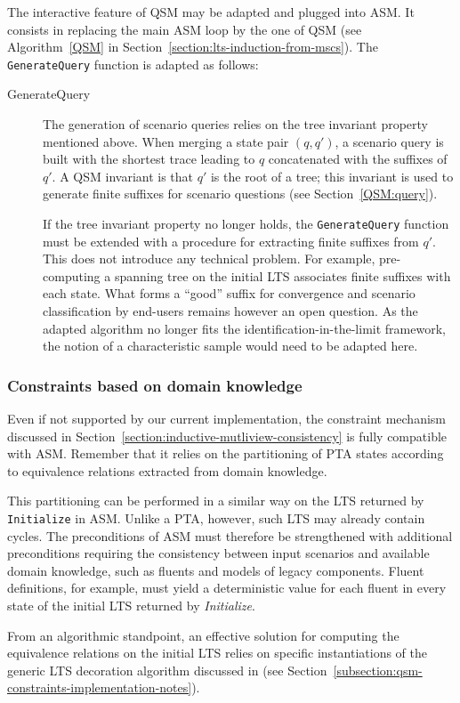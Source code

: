 The interactive feature of QSM may be adapted and plugged into ASM. It consists in replacing the main ASM loop by the one of QSM (see Algorithm~\ref{QSM} in Section~\ref{section:lts-induction-from-mscs}). The \texttt{GenerateQuery} function is adapted as follows:
\begin{description}

\item[GenerateQuery] The generation of scenario queries relies on the tree invariant property mentioned above. When merging a state pair $(q,q')$, a scenario query is built with the shortest trace leading to $q$ concatenated with the suffixes of $q'$. A QSM invariant is that $q'$ is the root of a tree; this invariant is used to generate finite suffixes for scenario questions (see Section~\ref{QSM:query}).

If the tree invariant property no longer holds, the \texttt{GenerateQuery} function must be extended with a procedure for extracting finite suffixes from $q'$. This does not introduce any technical problem. For example, pre-computing a spanning tree on the initial LTS associates finite suffixes with each state. What forms a ``good'' suffix for convergence and scenario classification by end-users remains however an open question. As the adapted algorithm no longer fits the identification-in-the-limit framework, the notion of a characteristic sample would need to be adapted here.

\end{description}

\subsubsection*{Constraints based on domain knowledge}

Even if not supported by our current implementation, the constraint mechanism discussed in Section~\ref{section:inductive-mutliview-consistency} is fully compatible with ASM. Remember that it relies on the partitioning of PTA states according to equivalence relations extracted from domain knowledge. 

This partitioning can be performed in a similar way on the LTS returned by \texttt{Initialize} in ASM. Unlike a PTA, however, such LTS may already contain cycles. The preconditions of ASM must therefore be strengthened with additional preconditions requiring the consistency between input scenarios and available domain knowledge, such as fluents and models of legacy components. Fluent definitions, for example, must yield a deterministic value for each fluent in every state of the initial LTS returned by \emph{Initialize}.

From an algorithmic standpoint, an effective solution for computing the equivalence relations on the initial LTS relies on specific instantiations of the generic LTS decoration algorithm discussed in \cite{Damas:2011} (see Section~\ref{subsection:qsm-constraints-implementation-notes}).
